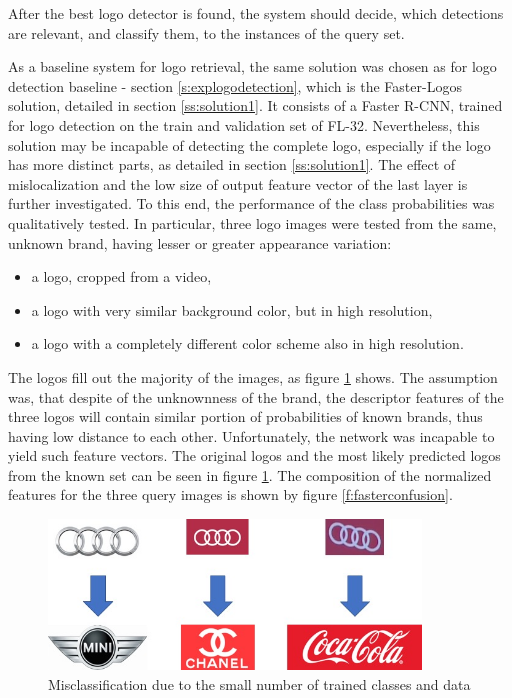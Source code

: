 After the best logo detector is found, the system should decide, which detections are relevant, and classify them, to the instances of the query set.

As a baseline system for logo retrieval, the same solution was chosen as for logo detection baseline - section \ref{s:explogodetection}, which is the Faster-Logos solution, detailed in section \ref{ss:solution1}. It consists of a Faster R-CNN, trained for logo detection on the train and validation set of FL-32.
\bigbreak
Nevertheless, this solution may be incapable of detecting the complete logo, especially if the logo has more distinct parts, as detailed in section \ref{ss:solution1}. The effect of mislocalization and the low size of output feature vector of the last layer is further investigated. To this end, the performance of the class probabilities was qualitatively tested. In particular, three logo images were tested from the same, unknown brand, having lesser or greater appearance variation:
\begin{itemize}
	\item a logo, cropped from a video,
	\item a logo with very similar background color, but in high resolution,
	\item a logo with a completely different color scheme also in high resolution.
\end{itemize}

The logos fill out the majority of the images, as figure \ref{f:confusion} shows. The assumption was, that despite of the unknownness of the brand, the descriptor features of the three logos will contain similar portion of probabilities of known brands, thus having low distance to each other. Unfortunately, the network was incapable to yield such feature vectors. The original logos and the most likely predicted logos from the known set can be seen in figure \ref{f:confusion}. The composition of the normalized features for the three query images is shown by figure \ref{f:fasterconfusion}.

\begin{figure}
  \centering
  \includegraphics[height=40mm]{images/mt/confusion.jpg}
  \caption{Misclassification due to the small number of trained classes and data}
  \label{f:confusion}
\end{figure}

